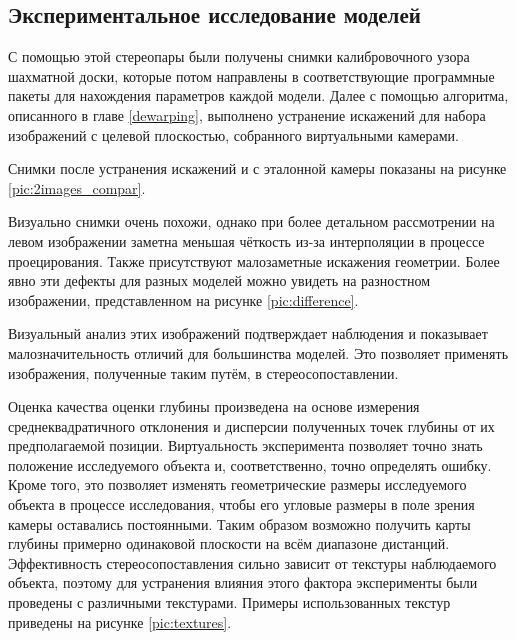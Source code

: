 \subsection{Экспериментальное исследование моделей}

С помощью этой стереопары были получены снимки калибровочного узора шахматной доски, 
которые потом  направлены в соответствующие программные пакеты для нахождения параметров каждой модели. Далее с помощью алгоритма, 
описанного в главе \ref{dewarping},		
выполнено устранение искажений для набора изображений с целевой плоскостью, собранного виртуальными камерами. 

Снимки после устранения искажений и с эталонной камеры показаны на рисунке \ref{pic:2images_compar}.


Визуально снимки очень похожи, однако при более детальном рассмотрении на левом изображении заметна меньшая чёткость
из-за интерполяции в процессе проецирования. Также присутствуют малозаметные искажения геометрии. Более 
явно эти дефекты для разных моделей можно увидеть на разностном изображении, представленном на рисунке \ref{pic:difference}. 


Визуальный анализ этих изображений подтверждает наблюдения и показывает малозначительность отличий для большинства моделей. Это позволяет применять
изображения, полученные таким путём, в стереосопоставлении. 

Оценка качества оценки глубины произведена на основе измерения среднеквадратичного отклонения и дисперсии полученных точек 
глубины от их предполагаемой позиции. Виртуальность эксперимента позволяет точно знать положение исследуемого объекта и, соответственно, 
точно определять ошибку. Кроме того, это позволяет изменять геометрические размеры исследуемого объекта в процессе исследования, чтобы его
угловые размеры в поле зрения камеры оставались постоянными. Таким образом возможно получить карты глубины примерно одинаковой 
плоскости на всём диапазоне дистанций.  Эффективность стереосопоставления \cite{SGBM} сильно зависит от текстуры наблюдаемого объекта, 
поэтому для устранения влияния этого фактора эксперименты были проведены с различными текстурами. 
Примеры использованных текстур приведены на рисунке \ref{pic:textures}. 

